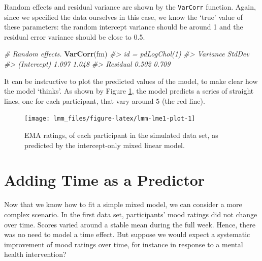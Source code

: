 \documentclass[]{book}
\newenvironment{Shaded}{\begin{snugshade}}{\end{snugshade}}
\newcommand{\KeywordTok}[1]{\textcolor[rgb]{0.13,0.29,0.53}{\textbf{#1}}}
\newcommand{\StringTok}[1]{\textcolor[rgb]{0.31,0.60,0.02}{#1}}
\newcommand{\CommentTok}[1]{\textcolor[rgb]{0.56,0.35,0.01}{\textit{#1}}}
\newcommand{\OperatorTok}[1]{\textcolor[rgb]{0.81,0.36,0.00}{\textbf{#1}}}
\newcommand{\NormalTok}[1]{#1}
\begin{document}
Random effects and residual variance are shown by the \texttt{VarCorr}
function. Again, since we specified the data ourselves in this case, we
know the `true' value of these parameters: the random intercept variance
should be around 1 and the residual error variance should be close to
0.5.

\begin{Shaded}
\begin{Highlighting}[]
\CommentTok{# Random effects.}
\KeywordTok{VarCorr}\NormalTok{(fm)}
\CommentTok{#> id = pdLogChol(1) }
\CommentTok{#>             Variance StdDev}
\CommentTok{#> (Intercept) 1.097    1.048 }
\CommentTok{#> Residual    0.502    0.709}
\end{Highlighting}
\end{Shaded}

It can be instructive to plot the predicted values of the model, to make
clear how the model `thinks'. As shown by Figure
\ref{fig:lmm-lme1-plot}, the model predicts a series of straight lines,
one for each participant, that vary around 5 (the red line).

\begin{Shaded}
\end{Shaded}

\begin{figure}

{\centering \texttt{[image: lmm\_files/figure-latex/lmm-lme1-plot-1]} 

}

\caption{EMA ratings, of each participant in the simulated data set, as predicted by the intercept-only mixed linear model.}\label{fig:lmm-lme1-plot}
\end{figure}

\section{Adding Time as a Predictor}\label{adding-time-as-a-predictor}

Now that we know how to fit a simple mixed model, we can consider a more
complex scenario. In the first data set, participants' mood ratings did
not change over time. Scores varied around a stable mean during the full
week. Hence, there was no need to model a time effect. But suppose we
would expect a systematic improvement of mood ratings over time, for
instance in response to a mental health intervention?
\end{document}
